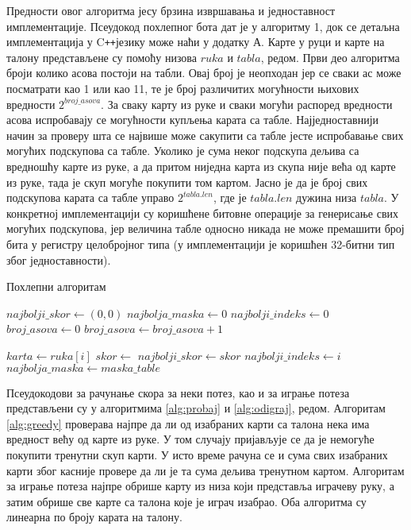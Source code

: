 \documentclass[a4paper, 12pt, ngerman]{article}
\newcommand{\cpp}{C\texttt{++}}
\begin{document}
Предности овог алгоритма јесу брзина извршавања и једноставност имплементације. Псеудокод похлепног бота дат је у алгоритму 1, док се детаљна имплементација у \cpp језику може наћи у додатку А. Карте у руци и карте на талону представљене су помоћу низова $ruka$ и $tabla$, редом. Први део алгоритма броји колико асова постоји на табли. Овај број је неопходан јер се сваки ас може посматрати као 1 или као 11, те је број различитих могућности њихових вредности $2^{broj\_asova}$. За сваку карту из руке и сваки могући распоред вредности асова испробавају се могућности купљења карата са табле. Најједноставнији начин за проверу шта се највише може сакупити са табле јесте испробавање свих могућих подскупова са табле. Уколико је сума неког подскупа дељива са вредношћу карте из руке, а да притом ниједна карта из скупа није већа од карте из руке, тада је скуп могуће покупити том картом. Јасно је да је број свих подскупова карата са табле управо $2^{tabla.len}$, где је $tabla.len$ дужина низа $tabla$. У конкретној имплементацији су коришћене битовне операције за генерисање свих могућих подскупова, јер величина табле односно никада не може премашити број бита у регистру целобројног типа (у имплементацији је коришћен 32-битни тип због једноставности).

\begin{algorithm}[htbp]
\caption{Похлепни алгоритам}
\label{alg:greedy}
\begin{algorithmic}
	\State $najbolji\_skor \gets (0, 0)$
	\State $najbolja\_maska \gets 0$
	\State $najbolji\_indeks \gets 0$
	\State $broj\_asova \gets 0$
		\State $broj\_asova \gets broj\_asova + 1$
	\EndIf
	\EndFor
	
				\State $karta \gets ruka[i]$
				\State $skor \gets$ 
					\State $najbolji\_skor \gets skor$
					\State $najbolji\_indeks \gets i$
					\State $najbolja\_maska \gets maska\_table$
				\EndIf
			\EndFor
		\EndFor	
	\EndFor
	\State{}
	\EndFunction
\end{algorithmic}
\end{algorithm}

Псеудокодови за рачунање скора за неки потез, као и за играње потеза представљени су у алгоритмима \ref{alg:probaj} и \ref{alg:odigraj}, редом. Алгоритам \ref{alg:greedy} проверава најпре да ли од изабраних карти са талона нека има вредност већу од карте из руке. У том случају пријављује се да је немогуће покупити тренутни скуп карти. У исто време рачуна се и сума свих изабраних карти због касније провере да ли је та сума дељива тренутном картом. Алгоритам за играње потеза најпре обрише карту из низа који представља играчеву руку, а затим обрише све карте са талона које је играч изабрао. Оба алгоритма су линеарна по броју карата на талону.
\end{document}
